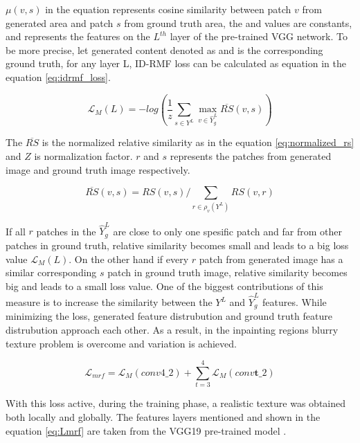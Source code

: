 \(\mu (v, s)\) in the equation represents cosine similarity between patch \(v\) from generated area and patch \(s\) from ground truth area, the  and  values are constants, and  represents the features on the \(L^{th}\) layer of the pre-trained VGG network. To be more precise, let generated content denoted as and is the corresponding ground truth, for any layer L, ID-RMF loss can be calculated as equation in the equation \ref{eq:idrmf_loss}.

\begin{equation}
    \mathcal{L}_{M}(L) = - log(\frac{1}{z} \sum_{s \in Y^{L}} \max_{v \in \widehat{Y}_{g}^{L}} \overline{RS} (v, s))
    \label{eq:idrmf_loss}
\end{equation}

The \(\overline{RS}\) is the normalized relative similarity as in the equation \ref{eq:normalized_rs} and \(Z\) is normalization factor. \(r\) and \(s\) represents the patches from generated image and ground truth image respectively.

\begin{equation}
    \overline{RS}(v,s) = RS(v,s) / \sum_{r \in \rho_{v}(Y^{L})} RS(v,r)
    \label{eq:normalized_rs}
\end{equation}

If all \(r\) patches in the \(\widehat{Y}_{g}^{L}\) are close to only one spesific patch and far from other patches in ground truth, relative similarity becomes small and leads to a big loss value \(\mathcal{L}_{M}(L)\). On the other hand if every \(r\) patch from generated image has a similar corresponding \(s\) patch in ground truth image, relative similarity becomes big and leads to a small loss value. One of the biggest contributions of this measure is to increase the similarity between the \(Y^{L}\) and \(\widehat{Y}_{g}^{L}\) features. While minimizing the loss, generated feature distrubution and ground truth feature distrubution approach each other. As a result, in the inpainting regions blurry texture problem is overcome and variation is achieved.

\begin{equation}
    \mathcal{L}_{mrf} = \mathcal{L}_{M}(conv4 \_ 2) + \sum_{t = 3}^{4} \mathcal{L}_{M}(conv \mathbf{t} \_ 2)
    \label{eq:Lmrf}
\end{equation}

With this loss active, during the training phase, a realistic texture was obtained both locally and globally. The features layers mentioned and shown in the equation \ref{eq:Lmrf} are taken from the VGG19 pre-trained model \cite{very_deep_conv}.

